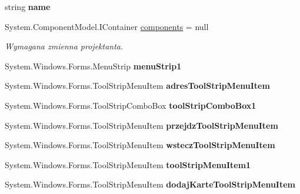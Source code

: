 \begin{DoxyCompactItemize}
string {\bfseries name}
\item 
System.\+Component\+Model.\+I\+Container \hyperlink{class_windows_forms_app2_1_1_przegladarka_a37fd573e6d383f202dbea9da1940a947}{components} = null
\begin{DoxyCompactList}\small\item\em Wymagana zmienna projektanta. \end{DoxyCompactList}\item 
\mbox{\label{class_windows_forms_app2_1_1_przegladarka_a2a73e12868cd6458c615db8cdf4bb065}} 
System.\+Windows.\+Forms.\+Menu\+Strip {\bfseries menu\+Strip1}
\item 
\mbox{\label{class_windows_forms_app2_1_1_przegladarka_adeee418fd4c8b86a5fc5139164bf98ba}} 
System.\+Windows.\+Forms.\+Tool\+Strip\+Menu\+Item {\bfseries adres\+Tool\+Strip\+Menu\+Item}
\item 
\mbox{\label{class_windows_forms_app2_1_1_przegladarka_af586dc21d800941eb565080947eafd55}} 
System.\+Windows.\+Forms.\+Tool\+Strip\+Combo\+Box {\bfseries tool\+Strip\+Combo\+Box1}
\item 
\mbox{\label{class_windows_forms_app2_1_1_przegladarka_afeb83789a4b241702af05d7fae1f6f99}} 
System.\+Windows.\+Forms.\+Tool\+Strip\+Menu\+Item {\bfseries przejdz\+Tool\+Strip\+Menu\+Item}
\item 
\mbox{\label{class_windows_forms_app2_1_1_przegladarka_a559c195b9b163e11b978d6dc9140118e}} 
System.\+Windows.\+Forms.\+Tool\+Strip\+Menu\+Item {\bfseries wstecz\+Tool\+Strip\+Menu\+Item}
\item 
\mbox{\label{class_windows_forms_app2_1_1_przegladarka_a06bd930ae9502e3130812c6e949d034e}} 
System.\+Windows.\+Forms.\+Tool\+Strip\+Menu\+Item {\bfseries tool\+Strip\+Menu\+Item1}
\item 
\mbox{\label{class_windows_forms_app2_1_1_przegladarka_aa847ef973d76583fad06069687cbde08}} 
System.\+Windows.\+Forms.\+Tool\+Strip\+Menu\+Item {\bfseries dodaj\+Karte\+Tool\+Strip\+Menu\+Item}

\end{DoxyCompactItemize}
